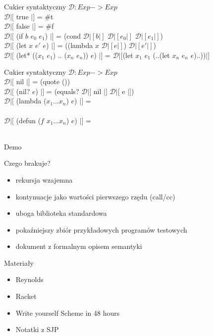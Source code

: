 \documentclass[12pt,serif]{beamer}
\begin{document}
\begin{frame}{Cukier syntaktyczny}
$\mathcal{D} : Exp -> Exp$ \newline
\\
$\mathcal{D}|[$ true $|]$ = \#t \\
$\mathcal{D}|[$ false $|]$ = \#f \newline
\\
$\mathcal{D}|[$ (if $b$ $e_0$ $e_1$) $|]$ =
   (cond $\mathcal{D}|[ b |]$ $\mathcal{D}|[ e_0 |]$ $\mathcal{D}|[ e_1 |]$) \newline
\\
$\mathcal{D}|[$ (let $x$ $e'$ $e$) $|]$ =
   ((lambda $x$ $\mathcal{D}|[e|]$) $\mathcal{D}|[e'|]$) \\
$\mathcal{D}|[$ (let* (($x_1$ $e_1$) .. ($x_n$ $e_n$)) $e$) $|]$ = 
   $\mathcal{D}|[$(let $x_1$ $e_1$ (..(let $x_n$ $e_n$ $e$)..))$|]$ \\
\end{frame}

\begin{frame}{Cukier syntaktyczny}
$\mathcal{D} : Exp -> Exp$ \newline
\\
$\mathcal{D}|[$ nil $|]$ = (quote ()) \\
$\mathcal{D}|[$ (nil? $e$) $|]$ = 
   (equals? $\mathcal{D}|[$ nil $|]$ $\mathcal{D}|[$ e $|]$) \newline
\\
$\mathcal{D}|[$ (lambda ($x_1 \ldots x_n$) $e$) $|]$ = \\
\newline
\\
$\mathcal{D}|[$ (defun ($f$ $x_1 \ldots x_n$) $e$) $|]$ = \\ 
\\

\end{frame}


\begin{frame}
\begin{center}
   \LARGE{Demo}
\end{center}
\end{frame}

\begin{frame}{Czego brakuje?}
\begin{itemize}
   \item rekursja wzajemna
   \item kontynuacje jako wartości pierwszego rzędu (call/cc)
   \item uboga biblioteka standardowa
   \item pokaźniejszy zbiór przykładowych programów testowych
   \item dokument z formalnym opisem semantyki
\end{itemize}
\end{frame}

\begin{frame}{Materiały}
\begin{itemize}
   \item Reynolds
   \item Racket
   \item Write yourself Scheme in 48 hours
   \item Notatki z SJP
\end{itemize}
\end{frame}
\end{document}
